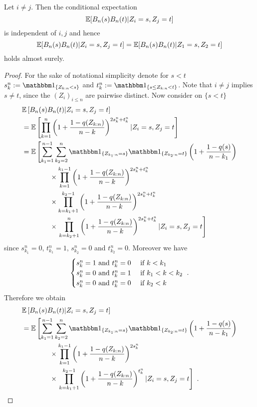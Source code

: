 \begin{lemma}
	\label{lem:bnbn_change_order}
	Let $i\neq j$. Then the conditional expectation 
	$$\mathbb{E}[B_n(s)B_n(t) | Z_i=s, Z_j=t]$$ 
	is independent of $i,j$ and hence
	$$\mathbb{E}[B_n(s)B_n(t) | Z_i=s, Z_j=t] = \mathbb{E}[B_n(s)B_n(t) | Z_1=s, Z_2=t]$$
	holds almost surely.
	\begin{proof}
		For the sake of notational simplicity denote for $s<t$ $s_k^n := \I{Z_{k:n} < s}$ and $t_k^n := \I{s\leq Z_{k:n} < t}$. Note that $i\neq j$ implies $s\neq t$, since the $(Z_i)_{i\leq n}$ are pairwise distinct. Now consider on $\{s<t\}$ 
		\begin{align*}
		&\E\left[B_n(s)B_n(t)|Z_i=s, Z_j=t\right]\\
		&= \E\left[\prod_{k=1}^{n}\left(1+\frac{1-q(Z_{k:n})}{n-k}\right)^{2s_k^n + t_k^n} | Z_i=s, Z_j=t\right]\\
		&= \E\left[\sum_{k_1=1}^{n-1} \sum_{k_2=2}^{n} \I{Z_{k_1:n} = s} \I{Z_{k_2:n} = t}\left(1+\frac{1-q(s)}{n-k_1}\right)\right.\\ 
		&\qquad\qquad \times \prod_{k=1}^{k_1-1}\left(1+\frac{1-q(Z_{k:n})}{n-k}\right)^{2s_k^n + t_k^n} \\
		&\qquad\qquad \times \prod_{k=k_1+1}^{k_2-1}\left(1+\frac{1-q(Z_{k:n})}{n-k}\right)^{2s_k^n + t_k^n} \\
		&\qquad\qquad \times  \left.\prod_{k=k_2+1}^{n}\left(1+\frac{1-q(Z_{k:n})}{n-k}\right)^{2s_k^n + t_k^n} | Z_i=s, Z_j=t\right]
		\end{align*}
		since $s_{k_1}^n = 0$, $t_{k_1}^n=1$, $s_{k_2}^n = 0$ and $t_{k_2}^n=0$. Moreover we have 
		\[ \begin{cases} 
		s_{k}^n = 1 \textrm{ and } t_{k}^n = 0 & \textrm{ if } k < k_1  \\
		s_{k}^n = 0 \textrm{ and } t_{k}^n = 1 & \textrm{ if } k_1 < k < k_2\\
		s_{k}^n = 0 \textrm{ and } t_{k}^n = 0 & \textrm{ if } k_2 < k \\
		\end{cases}\textrm{ .}
		\]		
		Therefore we obtain
		\begin{align*}
		&\E\left[B_n(s)B_n(t)|Z_i=s, Z_j=t\right]\\
		&= \E\left[\sum_{k_1=1}^{n-1} \sum_{k_2=2}^{n} \I{Z_{k_1:n} = s} \I{Z_{k_2:n} = t}\left(1+\frac{1-q(s)}{n-k_1}\right)\right.\\ 
		&\qquad\qquad \times \prod_{k=1}^{k_1-1}\left(1+\frac{1-q(Z_{k:n})}{n-k}\right)^{2s_k^n} \\
		&\qquad\qquad \times \left. \prod_{k=k_1+1}^{k_2-1}\left(1+\frac{1-q(Z_{k:n})}{n-k}\right)^{t_k^n} | Z_i=s, Z_j=t\right]\mdot

\end{align*}
\end{proof}
\end{lemma}
